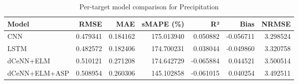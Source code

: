 \begin{table}
\caption{Per-target model comparison for Precipitation}
\begin{tabular}{lrrrrrr}
\toprule
Model & RMSE & MAE & sMAPE (\%) & R² & Bias & NRMSE \\
\midrule
CNN & 0.479341 & 0.184162 & 175.013940 & 0.050882 & -0.056711 & 3.298524 \\
LSTM & 0.482572 & 0.182406 & 174.700231 & 0.038044 & -0.049860 & 3.320758 \\
dCeNN+ELM & 0.510121 & 0.271208 & 174.642729 & -0.065884 & 0.044521 & 3.500514 \\
dCeNN+ELM+ASP & 0.508954 & 0.260306 & 145.102858 & -0.061015 & 0.040254 & 3.492511 \\
\bottomrule
\end{tabular}
\end{table}
